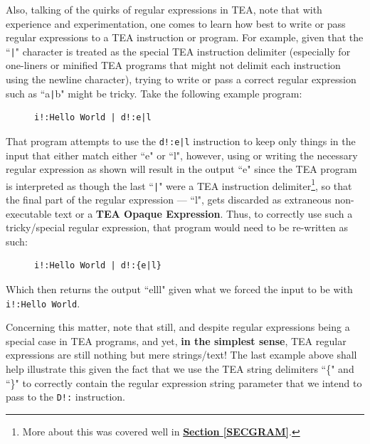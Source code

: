 \documentclass[a4paper, 18pt]{book} %
\begin{document}
Also, talking of the quirks of regular expressions in TEA, note that with experience and experimentation, one comes to learn how best to write or pass regular expressions to a TEA instruction or program. For example, given that the ``\verb$|$" character is treated as the special TEA instruction delimiter (especially for one-liners or minified TEA programs that might not delimit each instruction using the newline character), trying to write or pass a correct regular expression such as ``a\verb$|$b" might be tricky. Take the following example program:


\begin{figure}[H]
 \Large
  \centering
  \begin{tcolorbox}[teaterminalstyle, title=TEA Program Example 3]
  \begin{lstlisting}[language=TEA]
i!:Hello World | d!:e|l
   \end{lstlisting}
  \end{tcolorbox}
\end{figure}

That program attempts to use the \texttt{d!:e|l} instruction to keep only things in the input that either match either ``e" or ``l", however, using or writing the necessary regular expression as shown will result in the output ``e" since the TEA program is interpreted as though the last ``\verb#|#" were a TEA instruction delimiter\footnote{More about this was covered well in \textbf{\hyperref[SECGRAM]{Section \ref{SECGRAM}}}.}, so that the final part of the regular expression --- ``l", gets discarded as extraneous non-executable text or a \textbf{TEA Opaque Expression}. Thus, to correctly use such a tricky/special regular expression, that program would need to be re-written as such:



\begin{figure}[H]
 \Large
  \centering
  \begin{tcolorbox}[teaterminalstyle, title=TEA Program Example 3]
  \begin{lstlisting}[language=TEA]
i!:Hello World | d!:{e|l}
   \end{lstlisting}
  \end{tcolorbox}
\end{figure}

Which then returns the output ``elll" given what we forced the input to be with \texttt{i!:Hello World}.

Concerning this matter, note that still, and despite regular expressions being a special case in TEA programs, and yet, \textbf{in the simplest sense}, TEA regular expressions are still nothing but mere strings/text! The last example above shall help illustrate this given the fact that we use the TEA string delimiters ``\{" and ``\}" to correctly contain the regular expression string parameter that we intend to pass to the \texttt{D!:} instruction.
\end{document}
